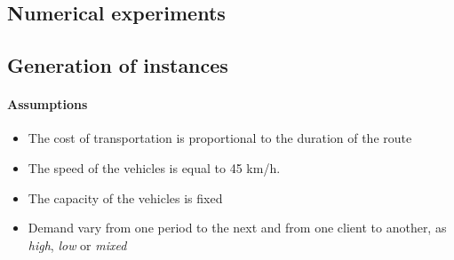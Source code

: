 \documentclass[a4paper,10pt]{article}
\begin{document}
\begin{linenumbers}


\section{Numerical experiments}
\label{sec:expe}
\subsection{Generation of instances}

\paragraph{Assumptions}
\begin{itemize}
    \item The cost of transportation is proportional to the duration of the route
    \item The speed of the vehicles is equal to 45 km/h.
    \item The capacity of the vehicles is fixed
    \item Demand vary from one period to the next and from one client to another, as {\em high}, {\em low} or {\em mixed}
    \end{itemize}



\end{linenumbers}
\end{document}
